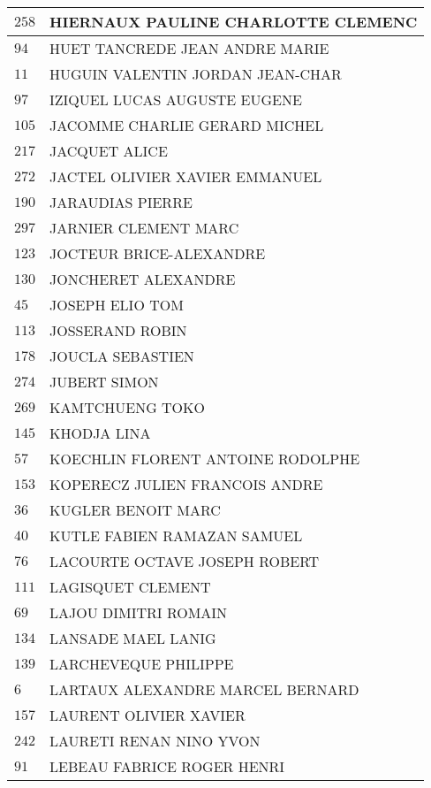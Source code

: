 \begin{xltabular}{\linewidth}{|l|X|}
    \hline
    $258$ & HIERNAUX PAULINE CHARLOTTE CLEMENC \\
    \hline
    $94$ & HUET TANCREDE JEAN ANDRE MARIE \\
    \hline
    $11$ & HUGUIN VALENTIN JORDAN JEAN-CHAR \\
    \hline
    $97$ & IZIQUEL LUCAS AUGUSTE EUGENE \\
    \hline
    $105$ & JACOMME CHARLIE GERARD MICHEL \\
    \hline
    $217$ & JACQUET ALICE \\
    \hline
    $272$ & JACTEL OLIVIER XAVIER EMMANUEL \\
    \hline
    $190$ & JARAUDIAS PIERRE \\
    \hline
    $297$ & JARNIER CLEMENT MARC \\
    \hline
    $123$ & JOCTEUR BRICE-ALEXANDRE \\
    \hline
    $130$ & JONCHERET ALEXANDRE \\
    \hline
    $45$ & JOSEPH ELIO TOM \\
    \hline
    $113$ & JOSSERAND ROBIN \\
    \hline
    $178$ & JOUCLA SEBASTIEN \\
    \hline
    $274$ & JUBERT SIMON \\
    \hline
    $269$ & KAMTCHUENG TOKO \\
    \hline
    $145$ & KHODJA LINA \\
    \hline
    $57$ & KOECHLIN FLORENT ANTOINE RODOLPHE \\
    \hline
    $153$ & KOPERECZ JULIEN FRANCOIS ANDRE \\
    \hline
    $36$ & KUGLER BENOIT MARC \\
    \hline
    $40$ & KUTLE FABIEN RAMAZAN SAMUEL \\
    \hline
    $76$ & LACOURTE OCTAVE JOSEPH ROBERT \\
    \hline
    $111$ & LAGISQUET CLEMENT \\
    \hline
    $69$ & LAJOU DIMITRI ROMAIN \\
    \hline
    $134$ & LANSADE MAEL LANIG \\
    \hline
    $139$ & LARCHEVEQUE PHILIPPE \\
    \hline
    $6$ & LARTAUX ALEXANDRE MARCEL BERNARD \\
    \hline
    $157$ & LAURENT OLIVIER XAVIER \\
    \hline
    $242$ & LAURETI RENAN NINO YVON \\
    \hline
    $91$ & LEBEAU FABRICE ROGER HENRI \\

\end{xltabular}
